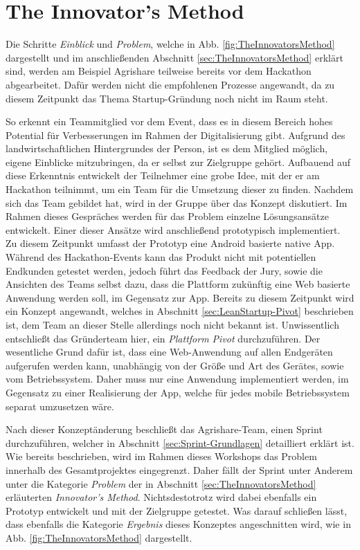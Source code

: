 \section{The Innovator's Method}
Die Schritte \textit{Einblick} und \textit{Problem}, welche in Abb. \ref{fig:TheInnovatorsMethod} dargestellt und im anschließenden Abschnitt \ref{sec:TheInnovatorsMethod} erklärt sind, werden am Beispiel Agrishare teilweise bereits vor dem Hackathon abgearbeitet. Dafür werden nicht die empfohlenen Prozesse angewandt, da zu diesem Zeitpunkt das Thema Startup-Gründung noch nicht im Raum steht.

So erkennt ein Teammitglied vor dem Event, dass es in diesem Bereich hohes Potential für Verbesserungen im Rahmen der Digitalisierung gibt. Aufgrund des landwirtschaftlichen Hintergrundes der Person, ist es dem Mitglied möglich, eigene Einblicke mitzubringen, da er selbst zur Zielgruppe gehört. Aufbauend auf diese Erkenntnis entwickelt der Teilnehmer eine grobe Idee, mit der er am Hackathon teilnimmt, um ein Team für die Umsetzung dieser zu finden. Nachdem sich das Team gebildet hat, wird in der Gruppe über das Konzept diskutiert. Im Rahmen dieses Gespräches werden für das Problem einzelne Lösungsansätze entwickelt. Einer dieser Ansätze wird anschließend prototypisch implementiert. Zu diesem Zeitpunkt umfasst der Prototyp eine Android basierte native App. Während des Hackathon-Events kann das Produkt nicht mit potentiellen Endkunden getestet werden, jedoch führt das Feedback der Jury, sowie die Ansichten des Teams selbst dazu, dass die Plattform zukünftig eine Web basierte Anwendung werden soll, im Gegensatz zur App. Bereits zu diesem Zeitpunkt wird ein Konzept angewandt, welches in Abschnitt \ref{sec:LeanStartup-Pivot} beschrieben ist, dem Team an dieser Stelle allerdings noch nicht bekannt ist. Unwissentlich entschließt das Gründerteam hier, ein \textit{Plattform Pivot} durchzuführen. Der wesentliche Grund dafür ist, dass eine Web-Anwendung auf allen Endgeräten aufgerufen werden kann, unabhängig von der Größe und Art des Gerätes, sowie vom Betriebssystem. Daher muss nur eine Anwendung implementiert werden, im Gegensatz zu einer Realisierung der App, welche für jedes mobile Betriebssystem separat umzusetzen wäre.

Nach dieser Konzeptänderung beschließt das Agrishare-Team, einen Sprint durchzuführen, welcher in Abschnitt \ref{sec:Sprint-Grundlagen} detailliert erklärt ist. Wie bereits beschrieben, wird im Rahmen dieses Workshops das Problem innerhalb des Gesamtprojektes eingegrenzt. Daher fällt der Sprint unter Anderem unter die Kategorie \textit{Problem} der in Abschnitt \ref{sec:TheInnovatorsMethod} erläuterten \textit{Innovator's Method}. Nichtsdestotrotz wird dabei ebenfalls ein Prototyp entwickelt und mit der Zielgruppe getestet. Was darauf schließen lässt, dass ebenfalls die Kategorie \textit{Ergebnis} dieses Konzeptes angeschnitten wird, wie in Abb. \ref{fig:TheInnovatorsMethod} dargestellt.